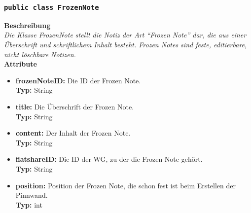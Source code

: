 \subsubsection{\texttt{public class FrozenNote}}

	\textbf{Beschreibung} \\
	\textit{Die Klasse FrozenNote stellt die Notiz der Art “Frozen Note” dar, die aus einer Überschrift und schriftlichem Inhalt besteht. Frozen Notes sind feste, editierbare, nicht löschbare Notizen.} \\
	
	\textbf{Attribute}
	\begin{itemize}
		\item \textbf{frozenNoteID:} Die ID der Frozen Note. \\
		\textbf{Typ:} String
		\item \textbf{title:} Die Überschrift der Frozen Note. \\
		\textbf{Typ:} String
		\item \textbf{content:} Der Inhalt der Frozen Note. \\
		\textbf{Typ:} String
		\item \textbf{flatshareID:} Die ID der WG, zu der die Frozen Note gehört. \\
		\textbf{Typ:} String
		\item \textbf{position:} Position der Frozen Note, die schon fest ist beim Erstellen der Pinnwand.\\
		\textbf{Typ:} int
	\end{itemize}
	
